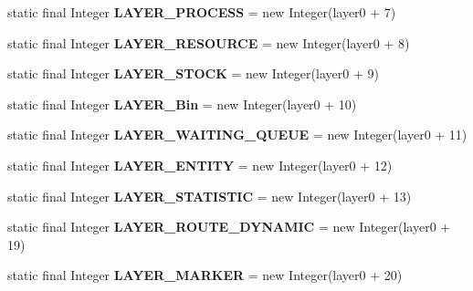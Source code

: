 \begin{DoxyCompactItemize}
\item 
static final Integer {\bfseries L\-A\-Y\-E\-R\-\_\-\-P\-R\-O\-C\-E\-S\-S} = new Integer(layer0 + 7)\label{interfacedesmoj_1_1extensions_1_1visualization2d_1_1engine_1_1model_grafic_1_1_grafic_a5b083ced38b8bddfa01a0a212e47a9ff}

\item 
static final Integer {\bfseries L\-A\-Y\-E\-R\-\_\-\-R\-E\-S\-O\-U\-R\-C\-E} = new Integer(layer0 + 8)\label{interfacedesmoj_1_1extensions_1_1visualization2d_1_1engine_1_1model_grafic_1_1_grafic_a2acee6b46abacb07caa1b9cfc4017b4b}

\item 
static final Integer {\bfseries L\-A\-Y\-E\-R\-\_\-\-S\-T\-O\-C\-K} = new Integer(layer0 + 9)\label{interfacedesmoj_1_1extensions_1_1visualization2d_1_1engine_1_1model_grafic_1_1_grafic_af2dfba6cf1bca9c018aede229254582f}

\item 
static final Integer {\bfseries L\-A\-Y\-E\-R\-\_\-\-Bin} = new Integer(layer0 + 10)\label{interfacedesmoj_1_1extensions_1_1visualization2d_1_1engine_1_1model_grafic_1_1_grafic_a3d46ba956d456e87ced0dad5911959a0}

\item 
static final Integer {\bfseries L\-A\-Y\-E\-R\-\_\-\-W\-A\-I\-T\-I\-N\-G\-\_\-\-Q\-U\-E\-U\-E} = new Integer(layer0 + 11)\label{interfacedesmoj_1_1extensions_1_1visualization2d_1_1engine_1_1model_grafic_1_1_grafic_a6db3266b2c36d809223bf476bfd8183b}

\item 
static final Integer {\bfseries L\-A\-Y\-E\-R\-\_\-\-E\-N\-T\-I\-T\-Y} = new Integer(layer0 + 12)\label{interfacedesmoj_1_1extensions_1_1visualization2d_1_1engine_1_1model_grafic_1_1_grafic_ac6cc82077ba792b4767956fc43498e8b}

\item 
static final Integer {\bfseries L\-A\-Y\-E\-R\-\_\-\-S\-T\-A\-T\-I\-S\-T\-I\-C} = new Integer(layer0 + 13)\label{interfacedesmoj_1_1extensions_1_1visualization2d_1_1engine_1_1model_grafic_1_1_grafic_a64e6c44569eecf06b0ceba855eb2e721}

\item 
static final Integer {\bfseries L\-A\-Y\-E\-R\-\_\-\-R\-O\-U\-T\-E\-\_\-\-D\-Y\-N\-A\-M\-I\-C} = new Integer(layer0 + 19)\label{interfacedesmoj_1_1extensions_1_1visualization2d_1_1engine_1_1model_grafic_1_1_grafic_ae7d841af7e4368c56969fc140d6ec67d}

\item 
static final Integer {\bfseries L\-A\-Y\-E\-R\-\_\-\-M\-A\-R\-K\-E\-R} = new Integer(layer0 + 20)\label{interfacedesmoj_1_1extensions_1_1visualization2d_1_1engine_1_1model_grafic_1_1_grafic_afe239a7448a38c52ab40116082467f48}


\end{DoxyCompactItemize}

